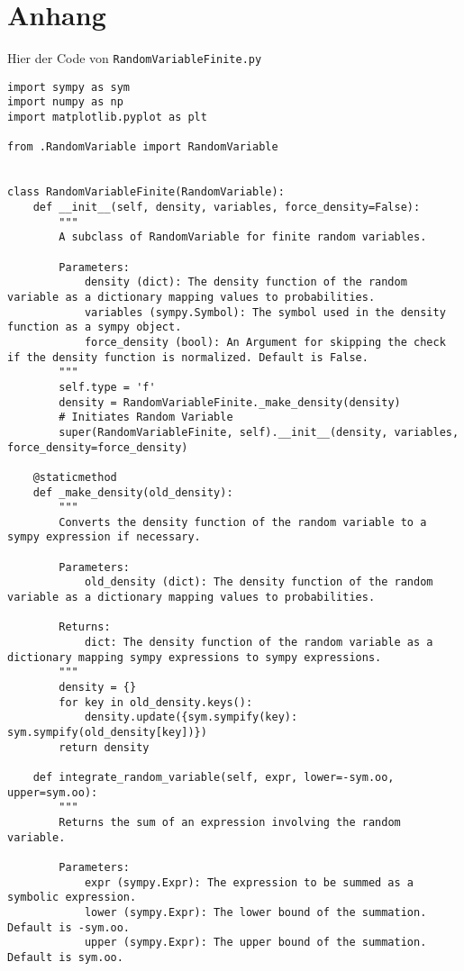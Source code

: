 \section{Anhang}
\hypertarget{Sec:Anhang}{}

Hier der Code von \lstinline|RandomVariableFinite.py|
\begin{small}
\begin{lstlisting}
import sympy as sym
import numpy as np
import matplotlib.pyplot as plt

from .RandomVariable import RandomVariable


class RandomVariableFinite(RandomVariable):
    def __init__(self, density, variables, force_density=False):
        """
        A subclass of RandomVariable for finite random variables.

        Parameters:
            density (dict): The density function of the random variable as a dictionary mapping values to probabilities.
            variables (sympy.Symbol): The symbol used in the density function as a sympy object.
            force_density (bool): An Argument for skipping the check if the density function is normalized. Default is False.
        """
        self.type = 'f'
        density = RandomVariableFinite._make_density(density)
        # Initiates Random Variable
        super(RandomVariableFinite, self).__init__(density, variables, force_density=force_density)

    @staticmethod
    def _make_density(old_density):
        """
        Converts the density function of the random variable to a sympy expression if necessary.

        Parameters:
            old_density (dict): The density function of the random variable as a dictionary mapping values to probabilities.

        Returns:
            dict: The density function of the random variable as a dictionary mapping sympy expressions to sympy expressions.
        """
        density = {}
        for key in old_density.keys():
            density.update({sym.sympify(key): sym.sympify(old_density[key])})
        return density

    def integrate_random_variable(self, expr, lower=-sym.oo, upper=sym.oo):
        """
        Returns the sum of an expression involving the random variable.

        Parameters:
            expr (sympy.Expr): The expression to be summed as a symbolic expression.
            lower (sympy.Expr): The lower bound of the summation. Default is -sym.oo.
            upper (sympy.Expr): The upper bound of the summation. Default is sym.oo.


\end{lstlisting}
\end{small}
